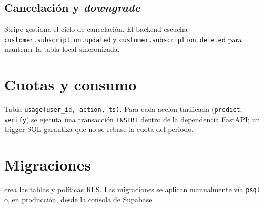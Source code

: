 \subsection{Cancelación y \emph{downgrade}}

Stripe gestiona el ciclo de cancelación. El backend escucha
\texttt{customer.subscription.updated} y
\texttt{customer.subscription.deleted} para mantener la tabla local
sincronizada.

\section{Cuotas y consumo}

Tabla \texttt{usage(user\_id, action, ts)}. Para cada acción tarificada
(\texttt{predict}, \texttt{verify}) se ejecuta una transacción
\texttt{INSERT} dentro de la dependencia FastAPI; un trigger SQL
garantiza que no se rebase la cuota del periodo.

\section{Migraciones}

 crea las tablas y políticas RLS. Las
migraciones se aplican manualmente vía \texttt{psql} o, en producción,
desde la consola de Supabase.

